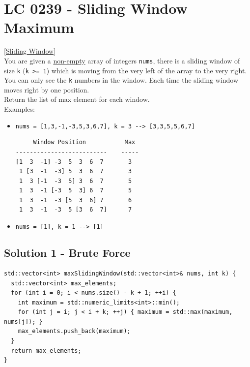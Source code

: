 \section{LC 0239 - Sliding Window Maximum}\label{lc0239}
{\hyperref[sec:sliding_window]{[Sliding Window]}}\\

You are given a \ul{non-empty} array of integers {\colorbox{CodeBackground}{\lstinline|nums|}}, there is a sliding window of size {\colorbox{CodeBackground}{\lstinline|k|}} ({\colorbox{CodeBackground}{\lstinline|k >= 1|}}) which is moving from the very left of the array to the very right. You can only see the {\colorbox{CodeBackground}{\lstinline|k|}} numbers in the window. Each time the sliding window moves right by one position.\\

Return the list of max element for each window. \\

Examples:
\begin{itemize}
\item {\colorbox{CodeBackground}{\lstinline|nums = [1,3,-1,-3,5,3,6,7], k = 3 --> [3,3,5,5,6,7]|}}
\begin{lstlisting}
     Window Position           Max
--------------------------    -----
[1  3  -1] -3  5  3  6  7       3
 1 [3  -1  -3] 5  3  6  7       3
 1  3 [-1  -3  5] 3  6  7       5
 1  3  -1 [-3  5  3] 6  7       5
 1  3  -1  -3 [5  3  6] 7       6
 1  3  -1  -3  5 [3  6  7]      7
\end{lstlisting}
\item {\colorbox{CodeBackground}{\lstinline|nums = [1], k = 1 --> [1]|}}
\end{itemize}

\subsection*{Solution 1 - Brute Force}
\begin{lstlisting}
std::vector<int> maxSlidingWindow(std::vector<int>& nums, int k) {
  std::vector<int> max_elements;
  for (int i = 0; i < nums.size() - k + 1; ++i) {
    int maximum = std::numeric_limits<int>::min();
    for (int j = i; j < i + k; ++j) { maximum = std::max(maximum, nums[j]); }
    max_elements.push_back(maximum);
  }
  return max_elements;
}
\end{lstlisting}

